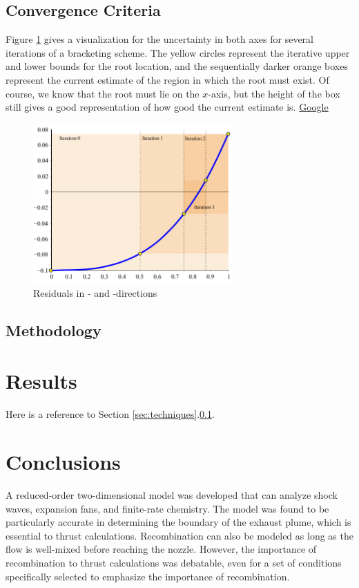 \documentclass[conference]{../aiaa-pretty}
\begin{document}
\subsection{Convergence Criteria} \label{ssec:criteria}
Figure \ref{fig:f:tol} gives a visualization for the uncertainty in both axes for several iterations of a bracketing scheme.  The yellow circles represent the iterative upper and lower bounds for the root location, and the sequentially darker orange boxes represent the current estimate of the region in which the root must exist.  Of course, we know that the root must lie on the $x$-axis, but the height of the box still gives a good representation of how good the current estimate is.  \href{http://www.google.com}{Google}

\begin{figure}
 \centering
 \includegraphics[width=3in]{./pics/f1_tol.pdf}
 \caption{ \label{fig:f:tol}
  Residuals in - and -directions}
\end{figure}


\subsection{Methodology}



\section{Results}
Here is a reference to Section \ref{sec:techniques}.\ref{ssec:criteria}.


\section{Conclusions}                            \label{sec:conclusion}
A reduced-order two-dimensional model was developed that can analyze shock waves, expansion fans, and finite-rate chemistry.  The model was found to be particularly accurate in determining the boundary of the exhaust plume, which is essential to thrust calculations.  Recombination can also be modeled as long as the flow is well-mixed before reaching the nozzle.  However, the importance of recombination to thrust calculations was debatable, even for a set of conditions specifically selected to emphasize the importance of recombination.
\end{document}

